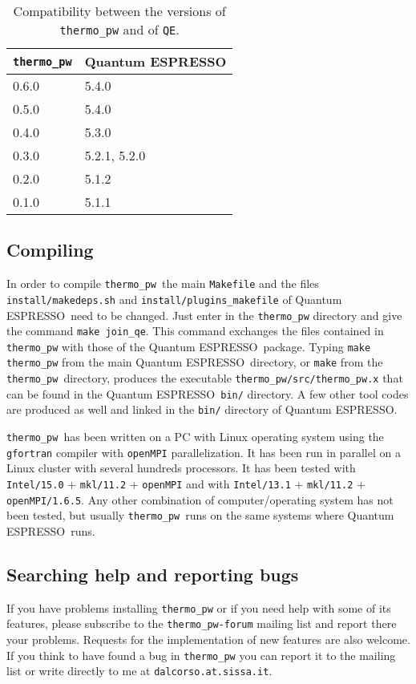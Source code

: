 \documentclass[12pt,a4paper]{article}
\def\qe{{\sc Quantum ESPRESSO}}
\def\thermo{\texttt{thermo\_pw}}
\begin{document}
\begin{center}
\begin{table}
\begin{tabular}{ll}
\hline
\hline
\texttt{thermo\_pw} & \qe  \\
\hline
0.6.0 & 5.4.0 \\
0.5.0 & 5.4.0 \\
0.4.0 & 5.3.0 \\
0.3.0 & 5.2.1, 5.2.0 \\
0.2.0 & 5.1.2 \\
0.1.0 & 5.1.1 \\
\hline
\hline
\end{tabular}
\caption{Compatibility between the versions of 
\texttt{thermo\_pw} and of \texttt{QE}.}
\end{table}
\end{center}

\subsection{\color{web-blue}Compiling}

In order to compile \thermo\ the main \texttt{Makefile} and the files
\texttt{install/makedeps.sh} and \texttt{install/plugins\_makefile}
of \qe\ need to be changed. Just enter in the \texttt{thermo\_pw}
directory and give the command \texttt{make join\_qe}. This command exchanges
the files contained in \texttt{thermo\_pw} with those of the \qe\ package.
Typing \texttt{make thermo\_pw} from the main \qe\ directory, or \texttt{make} 
from the \texttt{thermo\_pw}\ directory, produces the executable
\texttt{thermo\_pw/src/thermo\_pw.x} that can be found in the 
\qe\ \texttt{bin/} directory. A few other tool codes are produced as well
and linked in the \texttt{bin/} directory of \qe.

\thermo\ has been written on a PC with Linux operating system using the
\texttt{gfortran} compiler with \texttt{openMPI} parallelization. It has
been run in parallel on a Linux cluster with several hundreds processors.
It has been tested with \texttt{Intel/15.0} + \texttt{mkl/11.2} +
\texttt{openMPI} and with \texttt{Intel/13.1} + \texttt{mkl/11.2} +
\texttt{openMPI/1.6.5}.
Any other combination of computer/operating system has not been tested, but 
usually \thermo\ runs on the same systems where \qe\ runs. 

\subsection{\color{web-blue}Searching help and reporting bugs}
If you have problems installing \texttt{thermo\_pw} or if you need help
with some of its features, please subscribe to the \texttt{thermo\_pw-forum}
mailing list and report there your problems. Requests for the implementation 
of new features are also welcome. If you think to have found a bug 
in \texttt{thermo\_pw} you can report it to the mailing list or 
write directly to me at \texttt{dalcorso.at.sissa.it}.
\end{document}
